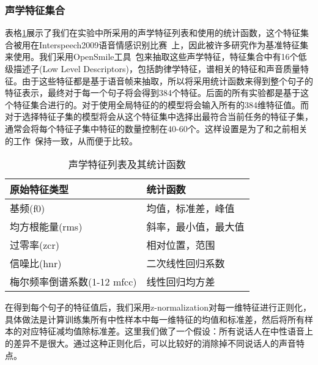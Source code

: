 \subsubsection{声学特征集合}
\label{sssec:acoustic_feature_set}

表格\ref{tab:acoustic_feature}展示了我们在实验中所采用的声学特征列表和使用的统计函数，这个特征集合被用在Interspeech2009语音情感识别比赛~\cite{Schuller2009The}上，因此被许多研究作为基准特征集来使用。我们采用OpenSmile工具~\cite{Eyben2010Opensmile}包来抽取这些声学特征，特征集合中有16个低级描述子(Low Level Descriptors)，包括韵律学特征，谱相关的特征和声音质量特征。由于这些特征都是基于语音帧来抽取，所以将采用统计函数来得到整个句子的特征表示，最终对于每一个句子将会得到384个特征。后面的所有实验都是基于这个特征集合进行的。对于使用全局特征的的模型将会输入所有的384维特征值。而对于选择特征子集的模型将会从这个特征集中选择出最符合当前任务的特征子集，通常会将每个特征子集中特征的数量控制在40-60个。这样设置是为了和之前相关的工作~\cite{Lee2009Emotion}保持一致，从而便于比较。

\begin{table}[htb]
\centering
\begin{minipage}[htb]{0.8\linewidth} %
\caption{声学特征列表及其统计函数}
\label{tab:acoustic_feature}
    \begin{tabularx}{\linewidth}{X<{\centering} X<{\centering}}
        \toprule[1.5pt]
        原始特征类型 & 统计函数 \\
        \midrule[1pt]
        基频(f0) & 均值，标准差，峰值 \\
        均方根能量(rms) & 斜率，最小值，最大值 \\
        过零率(zcr) & 相对位置，范围 \\
        信噪比(hnr) & 二次线性回归系数 \\
        梅尔频率倒谱系数(1-12 mfcc) & 线性回归均方差 \\
        \bottomrule[1.5pt]
    \end{tabularx}
\end{minipage}
\end{table}

在得到每个句子的特征值后，我们采用z-normalization对每一维特征进行正则化，具体做法是计算训练集所有中性样本中每一维特征的均值和标准差，然后将所有样本的对应特征减均值除标准差。这里我们做了一个假设：所有说话人在中性语音上的差异不是很大。通过这种正则化后，可以比较好的消除掉不同说话人的声音特点。

